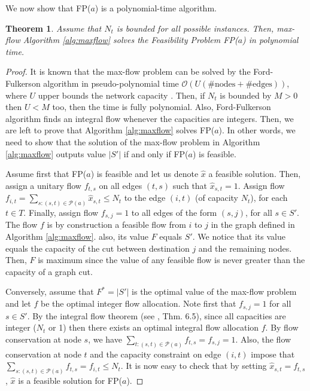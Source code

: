 \documentclass[11pt,oneside,a4paper]{article}     %
\newtheorem{theorem}{Theorem}
\begin{document}
We now show that FP($a$) is a polynomial-time algorithm.

\begin{theorem}
Assume that $N_t$ is bounded for all possible instances. Then, max-flow Algorithm \ref{alg:maxflow} solves the Feasibility Problem \textnormal{FP($a$)} in polynomial time.
\end{theorem}

\begin{proof}
It is known that the max-flow problem can be solved by the Ford-Fulkerson algorithm in pseudo-polynomial time $\mathcal O (U(\mathrm{\#nodes+\#edges}))$, where $U$ upper bounds the network capacity \cite{ahuja2014network}. Then, if $N_t$ is bounded by $M>0$ then $U<M$ too, then the time is fully polynomial. Also, Ford-Fulkerson algorithm finds an integral flow whenever the capacities are integers. Then, we are left to prove that Algorithm \ref{alg:maxflow} solves FP($a$). In other words, we need to show that the solution of the max-flow problem in Algorithm \ref{alg:maxflow} outputs value $|S'|$ if and only if FP($a$) is feasible.

Assume first that FP($a$) is feasible and let us denote $\hat x$ a feasible solution. Then, assign a unitary flow $f_{t,s}$ on all edges $(t,s)$ such that $\hat x_{s,t}=1$. Assign flow $f_{i,t}=\sum_{s:(s,t)\in \mathcal P(a)} \hat x_{s,t}\le N_t$ to the edge $(i,t)$ (of capacity $N_t$), for each $t\in T$. 
Finally, assign flow $f_{s,j}=1$ to all edges of the form $(s,j)$, for all $s\in S'$. The flow $f$ is by construction a feasible flow from $i$ to $j$ in the graph defined in Algorithm \ref{alg:maxflow}. also, its value $F$ equals $S'$. We notice that its value equals the capacity of the cut between destination $j$ and the remaining nodes. Then, $F$ is maximum since the value of any feasible flow is never greater than the capacity of a graph cut.

Conversely, assume that $F^*=|S'|$ is the optimal value of the max-flow problem and let $f$ be the optimal integer flow allocation. Note first that $f_{s,j}=1$ for all $s\in S'$. By the integral flow theorem (see \cite{ahuja2014network}, Thm. 6.5), since all capacities are integer ($N_t$ or 1) then there exists an optimal integral flow allocation $f$. By flow conservation at node $s$, we have $\sum_{t:(s,t)\in \mathcal P(a)} f_{t,s}=f_{s,j}=1$. Also, the flow conservation at node $t$ and the capacity constraint on edge $(i,t)$ impose that $\sum_{s:(s,t)\in \mathcal P(a)} f_{t,s}=f_{i,t}\le N_t$. It is now easy to check that by setting $\hat x_{s,t}=f_{t,s}$, $\hat x$ is a feasible solution for FP($a$).
\end{proof}
\end{document}
